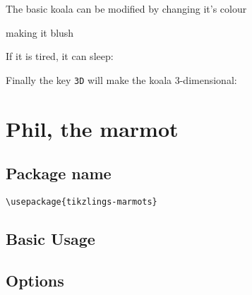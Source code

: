 \documentclass[parskip=half]{scrartcl}
\begin{document}
The basic koala can be modified by changing it's colour

\begin{tcblisting}{}
\koala[body=SteelBlue]
\end{tcblisting}

making it blush

\begin{tcblisting}{}
\koala[blush]
\end{tcblisting}

If it is tired, it can sleep:

\begin{tcblisting}{}
\koala[sleeping]
\end{tcblisting}

Finally the key \lstinline|3D| will make the koala 3-dimensional:

\begin{tcblisting}{}
\koala[3D]
\end{tcblisting}


\clearpage
\section[\textbackslash marmot]{Phil, the marmot}

\subsection{Package name}

\begin{tcolorbox}[lower separated=false, lefthand width=.8\linewidth]
\vspace*{0.5cm}
\lstinline|\usepackage{tikzlings-marmots}|
\vspace*{0.5cm}
\end{tcolorbox}

\subsection{Basic Usage}

\begin{tcblisting}{}
\marmot
\end{tcblisting}

\subsection{Options}
\end{document}
